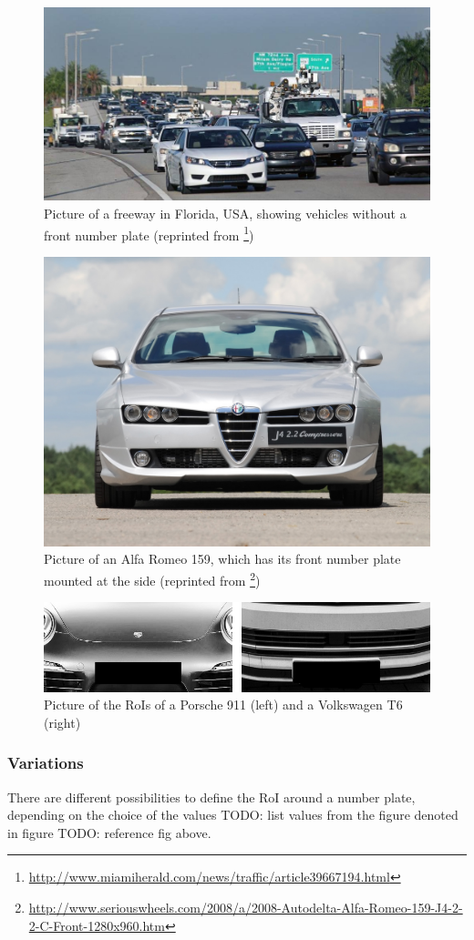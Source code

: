 \begin{figure}[bth]
  \centering
        \includegraphics[width=.35\linewidth]{gfx/florida_no_front_number_plates}
        \caption{Picture of a freeway in Florida, USA, showing vehicles without a front number plate (reprinted from \footnote{\url{http://www.miamiherald.com/news/traffic/article39667194.html}})}
        \label{fig:number_plate_no_front}
\end{figure}
\begin{figure}[bth]
  \centering
        \includegraphics[width=.35\linewidth]{gfx/number_plate_front_side}
        \caption{Picture of an Alfa Romeo 159, which has its front number plate mounted at the side (reprinted from \footnote{\url{http://www.seriouswheels.com/2008/a/2008-Autodelta-Alfa-Romeo-159-J4-2-2-C-Front-1280x960.htm}})}
        \label{fig:number_plate_side}
\end{figure}
\begin{figure}[bth]
  \centering
        \includegraphics[width=.35\linewidth]{gfx/roi_mask_porsche_t6}
        \caption{Picture of the RoIs of a Porsche 911 (left) and a Volkswagen T6 (right)}
        \label{fig:roiMaskPorscheT6}
\end{figure}

\subsubsection{Variations}
There are different possibilities to define the RoI around a number plate, depending on the choice of the values TODO: list values from the figure denoted in figure TODO: reference fig above.

